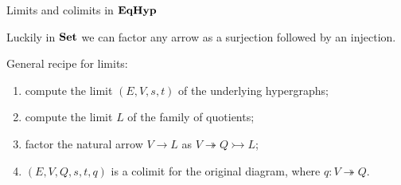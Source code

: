 \documentclass[aspectratio=169]{beamer}
\newcommand{\catname}[1]{\textbf{\textup{#1}}}
\newcommand{\EqHyp}{\catname{EqHyp}} %
\newcommand{\eto}{\twoheadrightarrow}
\newcommand{\mto}{\rightarrowtail}
\begin{document}
\begin{frame}{Limits and colimits in $\EqHyp$}

Luckily in $\catname{Set}$ we can factor any arrow as a surjection followed by an injection. 

\pause 
General recipe for limits: \pause 

\begin{enumerate}
	\item compute the limit $(E, V, s,t)$ of the underlying hypergraphs; \pause 
	\item compute the limit $L$ of the family of quotients; \pause 
	\item factor the natural arrow $V\to L$ as $V\eto Q \mto L$; \pause 
	\item $(E, V, Q, s,t, q )$ is a colimit for the original diagram, where $q\colon V\eto Q$.
\end{enumerate}	
	
\end{frame}
\end{document}
